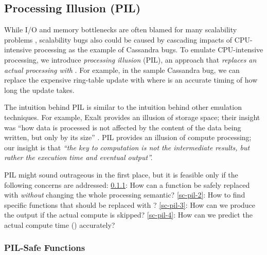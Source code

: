 

\subsection{Processing Illusion (PIL)}
\label{sc-pil}

While I/O and memory bottlenecks are often blamed for many scalability problems
\cite{Ousterhout+15-MakingSense,Konstantin+10-HDFSScalability, Wang+14-Exalt},
scalability bugs also could be caused by cascading impacts of CPU-intensive
processing as the example of Cassandra bugs.
%
To emulate CPU-intensive processing, we introduce {\em processing illusion}
(PIL), an approach that {\em replaces an actual processing with \sleep}.  For
example, in the sample Cassandra bug, we can replace the expensive ring-table
update with  where  is an accurate timing of how long the
update takes.


The intuition behind PIL is similar to the intuition behind other
emulation techniques.
%
For example, Exalt provides an illusion of storage space; their insight
was ``how data is processed is  not affected by the content of the data
being written, but only by its size'' \cite{Wang+14-Exalt}.
%
PIL provides an illusion of compute processing; our insight is that
{\em ``the
  key to computation is not the intermediate results, but rather the
  execution time and eventual output''.}
%

PIL might sound outrageous in the first place, but it is feasible only if 
the following concerns are addressed:
%
%
\sec\ref{sc-pil-1}: How can a function be safely replaced
with \sleep \textit{without} changing the whole processing semantic?
%
\sec\ref{sc-pil-2}:
How to find specific functions that should be replaced with \sleep?
%
\sec\ref{sc-pil-3}: How can we produce the output if the actual compute is
skipped?
%
\sec\ref{sc-pil-4}: How can we predict the actual compute time ()
accurately?

\subsubsection{PIL-Safe Functions}
\label{sc-pil-1}

